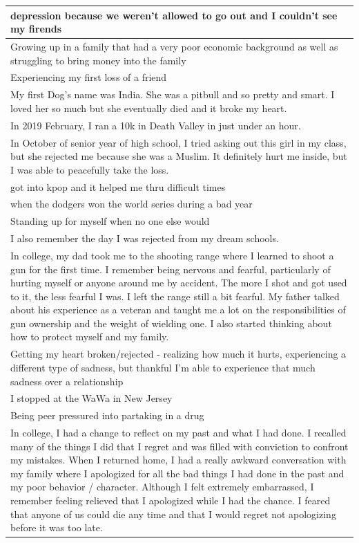\documentclass[
  .7em,
  letterpaper,
  DIV=11,
  numbers=noendperiod]{scrartcl}
\begin{document}
\begin{table}
\begin{tabular}{l}
depression because we weren't allowed to go out and I couldn't see my firends\\
\hline
Growing up in a family that had a very poor economic background as well as struggling to bring money into the family\\
\hline
Experiencing my first loss of a friend\\
\hline
My first Dog's name was India. She was a pitbull and so pretty and smart. I loved her so much but she eventually died and it broke my heart.\\
\hline
In 2019 February, I ran a 10k in Death Valley in just under an hour.\\
\hline
In October of senior year of high school, I tried asking out this girl in my class, but she rejected me because she was a Muslim. It definitely hurt me inside, but I was able to peacefully take the loss.\\
\hline
got into kpop and it helped me thru difficult times\\
\hline
when the dodgers won the world series during a bad year\\
\hline
Standing up for myself when no one else would\\
\hline
I also remember the day I was rejected from my dream schools.\\
\hline
In college, my dad took me to the shooting range where I learned to shoot a gun for the first time. I remember being nervous and fearful, particularly of hurting myself or anyone around me by accident. The more I shot and got used to it, the less fearful I was. I left the range still a bit fearful. My father talked about his experience as a veteran and taught me a lot on the responsibilities of gun ownership and the weight of wielding one. I also started thinking about how to protect myself and my family.\\
\hline
Getting my heart broken/rejected - realizing how much it hurts, experiencing a different type of sadness, but thankful I'm able to experience that much sadness over a relationship\\
\hline
I stopped at the WaWa in New Jersey\\
\hline
Being peer pressured into partaking in a drug\\
\hline
In college, I had a change to reflect on my past and what I had done. I recalled many of the things I did that I regret and was filled with conviction to confront my mistakes. When I returned home, I had a really awkward conversation with my family where I apologized for all the bad things I had done in the past and my poor behavior / character. Although I felt extremely embarrassed, I remember feeling relieved that I apologized while I had the chance. I feared that anyone of us could die any time and that I would regret not apologizing before it was too late.\\

\end{tabular}
\end{table}
\end{document}
